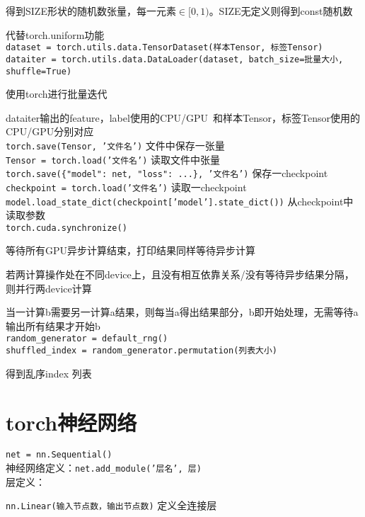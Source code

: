 \documentclass[UTF8]{ctexart}
\begin{document}
  得到SIZE形状的随机数张量，每一元素$\in [0,1)$。SIZE无定义则得到const随机数

  代替torch.uniform功能\\
\texttt{dataset = torch.utils.data.TensorDataset(样本Tensor, 标签Tensor)}\\
\texttt{dataiter = torch.utils.data.DataLoader(dataset, batch\_size=批量大小, shuffle=True)}

  使用torch进行批量迭代
  
  dataiter输出的feature，label使用的CPU/GPU\ 和样本Tensor，标签Tensor使用的CPU/GPU分别对应\\
\texttt{torch.save(Tensor, '文件名')} 文件中保存一张量\\
\texttt{Tensor = torch.load('文件名')} 读取文件中张量\\
\texttt{torch.save(\{"model": net, "loss": ...\}, '文件名')} 保存一checkpoint\\
\texttt{checkpoint = torch.load('文件名')} 读取一checkpoint\\
\texttt{model.load\_state\_dict(checkpoint['model'].state\_dict())} 从checkpoint中读取参数\\
\texttt{torch.cuda.synchronize()} 

  等待所有GPU异步计算结束，打印结果同样等待异步计算
  
  若两计算操作处在不同device上，且没有相互依靠关系/没有等待异步结果分隔，则并行两device计算
  
  当一计算b需要另一计算a结果，则每当a得出结果部分，b即开始处理，无需等待a输出所有结果才开始b\\
\texttt{random\_generator = default\_rng()}\\
\texttt{shuffled\_index = random\_generator.permutation(列表大小)}

  得到乱序index 列表

\section{torch神经网络}
\noindent \texttt{net = nn.Sequential()}\\
神经网络定义：\texttt{net.add\_module('层名', 层)}\\
层定义：

  \texttt{nn.Linear(输入节点数，输出节点数)} 定义全连接层
  
\end{document}
